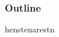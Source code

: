 \documentclass{beamer}
\begin{document}
\begin{frame}
	\frametitle{Outline}
	henstenarestn
\end{frame}
\end{document}

